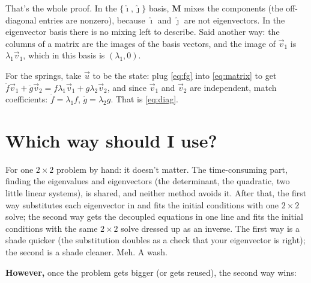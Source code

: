 \documentclass[12pt]{article}
\numberwithin{equation}{section}
\begin{document}
\noindent That's the whole proof. In the $\{\hat{\imath}, \hat{\jmath}\}$ basis,
$\mathbf{M}$ mixes the components (the off-diagonal entries are nonzero),
because $\hat{\imath}$ and $\hat{\jmath}$ are not eigenvectors. In the
eigenvector basis there is no mixing left to describe. Said another way:
the columns of a matrix are the images of the basis vectors, and the
image of $\vec{v}_1$ is $\lambda_1\vec{v}_1$, which in this basis is
$(\lambda_1, 0)$.

For the springs, take $\vec{u}$ to be the state: plug \eqref{eq:fg} into \eqref{eq:matrix} to get
$\ddot{f}\vec{v}_1 + \ddot{g}\vec{v}_2 = f\lambda_1\vec{v}_1 +
g\lambda_2\vec{v}_2$, and since $\vec{v}_1$ and $\vec{v}_2$ are
independent, match coefficients: $\ddot{f} = \lambda_1 f$, $\ddot{g} =
\lambda_2 g$. That is \eqref{eq:diag}.

\section{Which way should I use?}
\label{sec:which}

For one $2\times 2$ problem by hand: it doesn't matter. The time-consuming part,
finding the eigenvalues and eigenvectors (the determinant, the quadratic,
two little linear systems), is shared, and neither method avoids it.
After that, the first way substitutes each eigenvector in and fits the
initial conditions with one $2\times 2$ solve; the second way gets the
decoupled equations in one line and fits the initial conditions with the
same $2\times 2$ solve dressed up as an inverse. The first way is a shade
quicker (the substitution doubles as a check that your eigenvector is
right); the second is a shade cleaner. Meh. A wash.

\textbf{However,} once the problem gets bigger (or gets reused), the second way wins:
\end{document}
